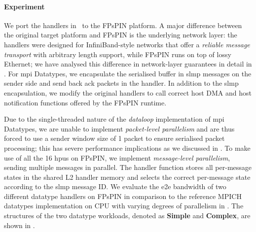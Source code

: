 \paragraph{Experiment} We port the handlers in~\cite{di_girolamo_network-accelerated_2019} to the FPsPIN platform.
A major difference between the original target platform and FPsPIN is the underlying network layer: the handlers were designed for InfiniBand-style networks that offer a \emph{reliable message transport} with arbitrary length support, while FPsPIN runs on top of lossy Ethernet; we have analysed this difference in network-layer guarantees in detail in .  For \ac{mpi} Datatypes, we encapsulate the serialised buffer in \ac{slmp} messages on the sender side and send back \ac{ack} packets in the handler.  In addition to the \ac{slmp} encapsulation, we modify the original handlers to call correct host DMA and host notification functions offered by the FPsPIN runtime. 

Due to the single-threaded nature of the \emph{dataloop} implementation of \ac{mpi} Datatypes, we are unable to implement \emph{packet-level parallelism} and are thus forced to use a sender window size of 1 packet to ensure serialised packet processing; this has severe performance implications as we discussed in .  To make use of all the 16 \ac{hpu}s on FPsPIN, we implement \emph{message-level parallelism}, sending multiple messages in parallel.  The handler function stores all per-message states in the shared L2 handler memory and selects the correct per-message state according to the \ac{slmp} message ID.  We evaluate the \ac{e2e} bandwidth of two different datatype handlers on FPsPIN in comparison to the reference MPICH datatypes implementation on CPU with varying degrees of parallelism in .  The structures of the two datatype workloads, denoted as \textbf{Simple} and \textbf{Complex}, are shown in .

